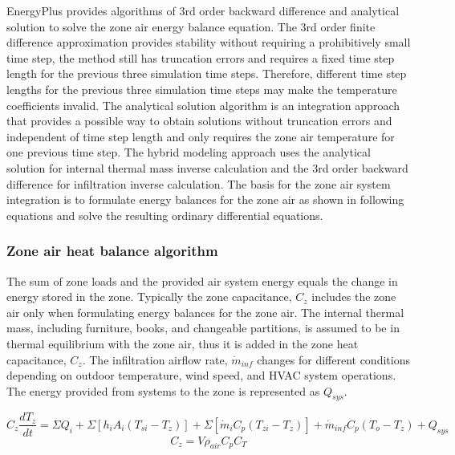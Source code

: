 \documentclass[11pt]{article}
\begin{document}
EnergyPlus provides algorithms of 3rd order backward difference and analytical solution to solve the zone air energy balance equation. The 3rd order finite difference approximation provides stability without requiring a prohibitively small time step, the method still has truncation errors and requires a fixed time step length for the previous three simulation time steps. Therefore, different time step lengths for the previous three simulation time steps may make the temperature coefficients invalid. The analytical solution algorithm is an integration approach that provides a possible way to obtain solutions without truncation errors and independent of time step length and only requires the zone air temperature for one previous time step. The hybrid modeling approach uses the analytical solution for internal thermal mass inverse calculation and the 3rd order backward difference for infiltration inverse calculation. The basis for the zone air system integration is to formulate energy balances for the zone air as shown in following equations and solve the resulting ordinary differential equations. 

\subsubsection{Zone air heat balance algorithm}\label{Zone-air-heat-balance-algorithm}
The sum of zone loads and the provided air system energy equals the change in energy stored in the zone. Typically the zone capacitance, $C_z$ includes the zone air only when formulating energy balances for the zone air. The internal thermal mass, including furniture, books, and changeable partitions, is assumed to be in thermal equilibrium with the zone air, thus it is added in the zone heat capacitance, $C_z$.  The infiltration airflow rate, $\dot{m}_{inf}$ changes for different conditions depending on outdoor temperature, wind speed, and HVAC system operations. The energy provided from systems to the zone is represented as $Q_{sys}$.

\begin{equation}
C_z \frac {dT_z} {dt} = \Sigma Q_i +\Sigma[h_i A_i (T_{si} - T_z)] + \Sigma [\dot{m}_i C_p (T_{zi}-T_z)] + \dot{m}_{inf} C_p (T_o - T_z) + Q_{sys}
\end{equation}
\begin{equation}
C_z = V \rho_{air} C_p C_T
\end{equation}
\end{document}
